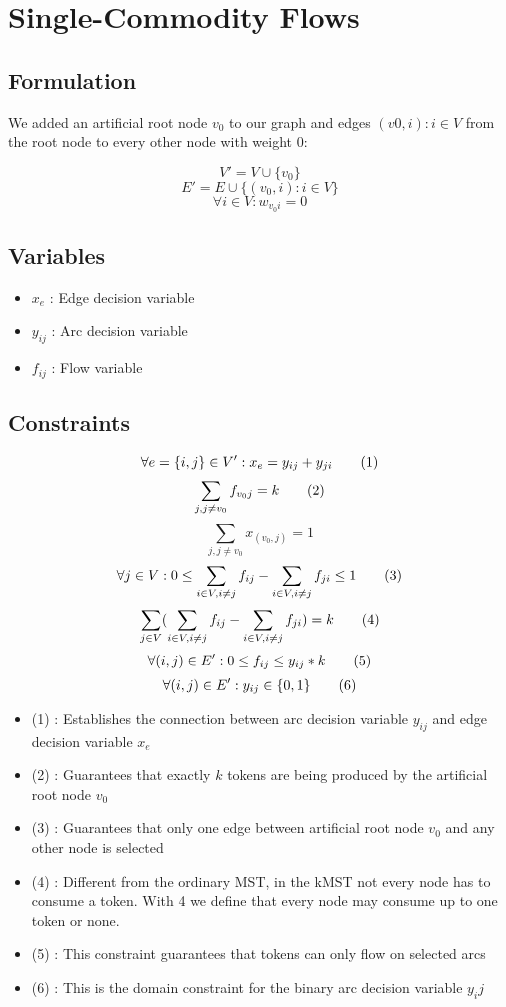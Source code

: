 \section{Single-Commodity Flows}

\subsection{Formulation}

We added an artificial root node $v_0$ to our graph and edges $(v0,i) : i \in V$  from the root node to every other node with weight $0$:

\[V' = V \cup \{v_0\}\]
\[E' = E \cup \{(v_0,i) : i \in V\}\]
\[\forall i \in V : w_{v_0i} = 0 \]

\subsection{Variables}

\begin{itemize}
	\item $x_{e}$ : Edge decision variable
	\item $y_{ij}$ : Arc decision variable
	\item $f_{ij}$ : Flow variable
\end{itemize}

\subsection{Constraints}
\[\forall e = \{i,j\} \in V' : x_e = y_{ij} + y_{ji} \addtag \]
\[\sum_{j,j \neq v_0}f_{v_0j} = k \addtag \]
\[\sum_{j,j \neq v_0}x_{(v_0,j)} = 1\]
\[\forall j \in V : 0 \leq \sum_{i \in V,i \neq j}f_{ij} - \sum_{i \in V,i \neq j}f_{ji} \leq 1 \addtag \]
\[\sum_{j \in V}(\sum_{i \in V,i \neq j}f_{ij} - \sum_{i \in V,i \neq j}f_{ji}) = k \addtag \]
\[\forall (i,j) \in E' : 0 \leq f_{ij} \leq y_{ij}*k \addtag \]
\[\forall (i,j) \in E' : y_{ij} \in \{0,1\} \addtag \]

\begin{itemize}
	\item (1) : Establishes the connection between arc decision variable $y_{ij}$ and edge decision variable $x_e$
	\item (2) : Guarantees that exactly $k$ tokens are being produced by the artificial root node $v_0$ 
	\item (3) : Guarantees that only one edge between artificial root node $v_0$ and any other node is selected
	\item (4) : Different from the ordinary MST, in the kMST not every node has to consume a token. With 4 we define that every node may consume up to one token or none.
	\item (5) : This constraint guarantees that tokens can only flow on selected arcs
	\item (6) : This is the domain constraint for the binary arc decision variable $y_ij$
\end{itemize}

